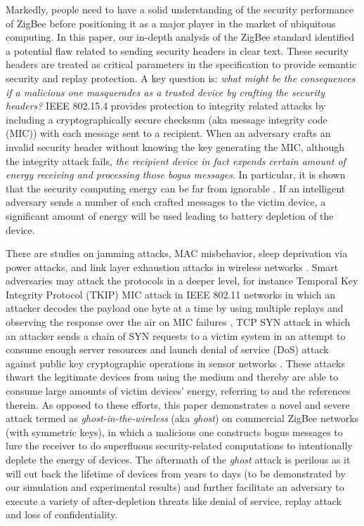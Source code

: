\documentclass[10pt,journal,cspaper,compsoc]{IEEEtran}
\begin{document}
Markedly, people need to have a solid understanding of the security performance of ZigBee before positioning it as a major player in the market of ubiquitous computing. In this paper, our in-depth analysis of the ZigBee standard identified a potential flaw related to sending security headers in clear text. These security headers are treated as critical parameters in the specification to provide semantic security and replay protection. A key question is: {\em what might be the consequences if a malicious one masquerades as a trusted device by crafting the security headers?} IEEE 802.15.4 provides protection to integrity related attacks by including a cryptographically secure checksum (aka message integrity code (MIC)) with each message sent to a recipient. When an adversary crafts an invalid security header without knowing the key generating the MIC, although the integrity attack fails, \emph{the recipient device in fact expends certain amount of energy receiving and processing those bogus messages}. In particular, it is shown that the security computing energy can be far from ignorable \cite{xiao2006mac, doomun2007energy}. If an intelligent adversary sends a number of such crafted messages to the victim device, a significant amount of energy will be used leading to battery depletion of the device.

There are studies on jamming attacks, MAC misbehavior, sleep deprivation via power attacks, and link layer exhaustion attacks in wireless networks \cite{zheng2006toward,li2010optimal,tang2014real}. Smart adversaries may attack the protocols in a deeper level, for instance Temporal Key Integrity Protocol (TKIP) MIC attack in IEEE 802.11 networks in which an attacker decodes the payload one byte at a time by using multiple replays and observing the response over the air on MIC failures \cite{lashkari2009survey}, TCP SYN attack in which an attacker sends a chain of SYN requests to a victim system in an attempt to consume enough server resources and launch denial of service (DoS) attack \cite{wang2002detecting} against public key cryptographic operations in sensor networks \cite{dong2013providing}. These attacks thwart the legitimate devices from using the medium and thereby are able to consume large amounts of victim devices' energy, referring to \cite{survey,sleep} and the references therein. As opposed to these efforts, this paper demonstrates a novel and severe attack termed as {\em ghost-in-the-wireless} (aka {\em ghost}) on commercial ZigBee networks (with symmetric keys), in which a malicious one constructs bogus messages to lure the receiver to do superfluous security-related computations to intentionally deplete the energy of devices. The aftermath of the {\em ghost} attack is perilous as it will cut back the lifetime of devices from years to days (to be demonstrated by our simulation and experimental results) and further facilitate an adversary to execute a variety of after-depletion threats like denial of service, replay attack and loss of confidentiality.
\end{document}
